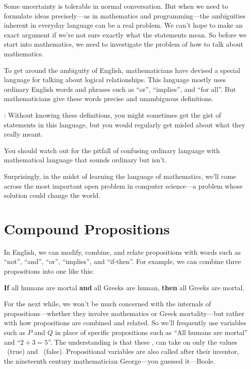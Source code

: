 Some uncertainty is tolerable in normal conversation.  But when we need to
formulate ideas precisely---as in mathematics and programming---the
ambiguities inherent in everyday language can be a real problem.  We can't
hope to make an exact argument if we're not sure exactly what the
statements mean.  So before we start into mathematics, we need to
investigate the problem of how to talk about mathematics.

To get around the ambiguity of English, mathematicians have devised a
special language for talking about logical
relationships.  This language mostly uses ordinary English words and
phrases such as ``or'', ``implies'', and ``for all''.  But mathematicians
 give these words
precise and unambiguous definitions.
\begin{editingnotes}
: Without knowing these
  definitions, you might sometimes get the gist of statements in this
  language, but you would regularly get misled about what they really
  meant.
\end{editingnotes}
You should watch out for the pitfall of confusing ordinary language with
mathematical language that sounds ordinary but isn't.

Surprisingly, in the midst of learning the language of mathematics, we'll
come across the most important open problem in computer science---a
problem whose solution could change the world.

\section{Compound Propositions}

In English, we can modify, combine, and relate propositions with words
such as ``not'', ``and'', ``or'', ``implies'', and ``if-then''.
For example, we can combine three propositions into one like this:
%
\begin{center}
\textbf{If} all humans are mortal \textbf{and} all Greeks are human,
\textbf{then} all Greeks are mortal.
\end{center}

For the next while, we won't be much concerned with the internals of
propositions---whether they involve mathematics or Greek mortality---but
rather with how propositions are combined and related.  So we'll
frequently use variables such as $P$ and $Q$ in place of specific
propositions such as ``All humans are mortal'' and ``$2 + 3 = 5$''.  The
understanding is that these , can take on only the values \true~(true) and
\false~(false).  Propositional variables are also called  after their inventor, the 
nineteenth century mathematician George---you guessed it---Boole.

